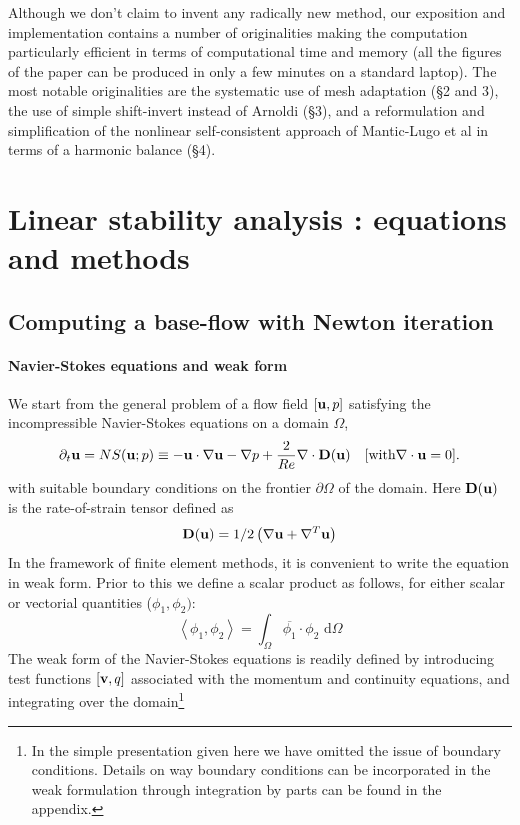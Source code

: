 \documentclass[twocolumn,10pt]{asme2ej}
\newcommand{\be}[1]{ \begin{equation} \label{#1}}
\newcommand{\ee}{\end{equation}}
\begin{document}
Although we don't claim to invent any radically new method, our exposition and implementation contains a number of originalities making the computation particularly efficient in terms of computational time and memory (all the figures of the paper can be produced in only a few minutes on a standard laptop). The most notable originalities are the systematic use of mesh adaptation (\S 2 and 3), the use of simple shift-invert instead of Arnoldi (\S 3), and a reformulation and simplification of the nonlinear self-consistent approach of Mantic-Lugo et al in terms of a harmonic balance (\S 4).
 


\section{Linear stability analysis : equations and methods}
\vspace{.2cm}

\subsection{Computing a base-flow with Newton iteration}
\vspace{.2cm}

\paragraph{Navier-Stokes equations and weak form}

We start from the general problem of a flow field $[{\bf u},p]$ satisfying the incompressible Navier-Stokes equations on a domain $\Omega$,
\be{NSprimitive}
\partial_t {\bf u} = NS ({\bf u};p)
\equiv - {\bf u} \cdot \nabla {\bf u} - \nabla p + \frac{2}{Re}  \nabla \cdot {\bf D}({\bf u})  \quad [\mbox{with} \nabla \cdot {\bf u} = 0].  \\
\ee
with suitable boundary conditions on the frontier $\partial \Omega$ of the domain.
Here $ {\bf D}({\bf u}) $ is the rate-of-strain tensor defined as
$$
 {\bf D}({\bf u}) = 1/2
\left( \nabla {\bf u} +  \nabla^T  {\bf u}\right)
$$ 
In the framework of finite element methods, it is convenient to write the equation in weak form.
Prior to this we define a scalar product as follows, for either scalar or vectorial quantities 
($\phi_1, \phi_2)$:
$$
\left< \phi_1, \phi_2 \right> = \int_\Omega \overline{\phi_1} \cdot \phi_2   \mbox{ d} \Omega
$$
The weak form of the Navier-Stokes equations is readily defined by introducing test functions 
$[{\bf v},q]$ associated with the momentum and continuity equations, and integrating over the domain\footnote{In the simple presentation given here we have omitted the issue of boundary conditions. Details on way boundary conditions can be incorporated in the weak formulation through integration by parts can be found in the appendix.}
\end{document}
